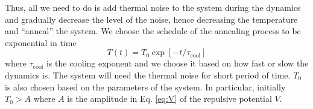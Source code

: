 \documentclass[nofootinbib,preprint,floatfix,titlepage,superscriptaddress]{revtex4} %
\begin{document}
Thus, all we need to do is add thermal noise to the system during the dynamics and gradually decrease the level of the noise, hence decreasing the temperature and ``anneal'' the system. We choose the schedule of the annealing process to be exponential in time
\begin{equation}
T(t) = T_0 \exp[-t/\tau_{\mathrm{cool}}] \label{eq:coolexp}
\end{equation}
where $\tau_{\mathrm{cool}}$ is the cooling exponent and we choose it based on how fast or slow the dynamics is. The system will need the thermal noise for short period of time. $T_0$ is also chosen based on the parameters of the system. In particular, initially $T_0 > A$ where $A$ is the amplitude in Eq. \eqref{eq:V} of the repulsive potential $V$.   
\end{document}
